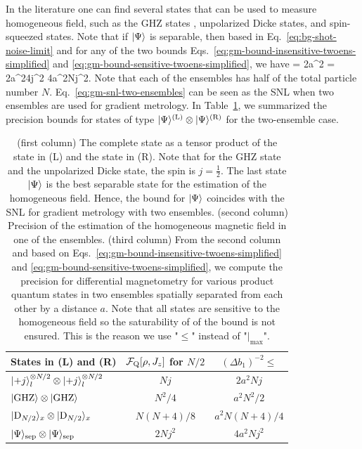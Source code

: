 In the literature one can find several states that can be used to measure homogeneous field, such as the GHZ states \cite{Greenberger1989}, unpolarized Dicke states, and spin-squeezed states.
Note that if $\vert{\Psi}\rangle$ is separable, then based in Eq.~\eqref{eq:bg-shot-noise-limit} and for any of the two bounds Eqs.~\eqref{eq:gm-bound-insensitive-twoens-simplified} and \eqref{eq:gm-bound-sensitive-twoens-simplified}, we have
\be
  = 2a^2
  = 2a^24j^2
  \leqslant 4a^2Nj^2.
  \label{eq:gm-snl-two-ensembles}
\ee
Note that each of the ensembles has half of the total particle number $N$.
Eq.~\eqref{eq:gm-snl-two-ensembles} can be seen as the SNL when two ensembles are used for gradient metrology.
In Table~\ref{tab:result-states-two-ensembles}, we summarized the precision bounds for states of type $\vert{\Psi}\rangle^{(\text{L})}\otimes \vert{\Psi}\rangle^{(\text{R})}$ for the two-ensemble case.
\begin{table}
  \begin{center}
    \begin{tabular}{|l|c|c|}
    \hline
    States in (L) and (R) & $\mathcal{F}_{\textnormal{Q}}[{\textstyle \rho,J_z}]$ for $N/2$ & $(\Delta b_1)^{-2}\leqslant$ \\
    \hline
    $\vert{+j}\rangle_l^{\otimes N/2} \otimes \vert{+j}\rangle_l^{\otimes N/2} $ & $Nj$ & $ 2a^2Nj$ \\
    \hline
    $\vert{\textnormal{GHZ}}\rangle\otimes\vert{\textnormal{GHZ}}\rangle$ & $N^2/4$ & $ a^2N^2/2$\\
    \hline
    $\vert{\ensuremath{\textnormal{D}_{{N/2}}}}\rangle_{x}\otimes \vert{\ensuremath{\textnormal{D}_{{N/2}}}}\rangle_{x}$ & $N(N+4)/8$ & $ a^2N(N+4)/4$\\
      \hline
    $\vert{\Psi}\rangle_{\text{sep}}\otimes\vert{\Psi}\rangle_{\text{sep}}$ & $2Nj^2$  & $ 4a^2Nj^2$ \\
    \hline
    \end{tabular}
  \end{center}
\caption{(first column) The complete state as a tensor product of the state in (L) and the state in (R). Note that for the GHZ state and the unpolarized Dicke state, the spin is $j=\frac{1}{2}$.
The last state $\vert{\Psi}\rangle$ is the best separable state for the estimation of the homogeneous field.
Hence, the bound for $\vert{\Psi}\rangle$ coincides with the SNL for gradient metrology with two ensembles.
(second column) Precision of the estimation of the homogeneous magnetic field in one of the ensembles.
(third column) From the second column and based on Eqs.~\eqref{eq:gm-bound-insensitive-twoens-simplified} and \eqref{eq:gm-bound-sensitive-twoens-simplified}, we compute the precision for differential magnetometry for various product quantum states in two ensembles spatially separated from each other by a distance $a$.
Note that all states are sensitive to the homogeneous field so the saturability of of the bound is not ensured.
This is the reason we use "$\leqslant$" instead of "$|_{\max}$".
}
\label{tab:result-states-two-ensembles}
\end{table}

